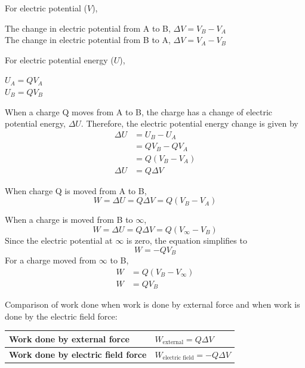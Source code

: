 \documentclass[../../../main.tex]{subfiles}
\begin{document}
\begin{mdframed}
    For electric potential (\(V\)),

    \centering
    The change in electric potential from A to B, \(\Delta V =V_B-V_A\) \\
    The change in electric potential from B to A,  \(\Delta V =V_A-V_B\)
\end{mdframed}

\begin{mdframed}
    For electric potential energy (\(U\)),

    {\centering
            \(U_A=QV_A\) \\
            \(U_B=QV_B\) \\
        }

    \bigskip

    When a charge Q moves from A to B, the charge has a change of electric potential energy, \(\Delta U\). Therefore, the electric potential energy change is given by
    \begin{align*}
        \Delta U & =U_B-U_A    \\
                 & =QV_B-QV_A  \\
                 & =Q(V_B-V_A) \\
        \Delta U & =Q\Delta V
    \end{align*}
\end{mdframed}

\begin{mdframed}
    When charge Q is moved from A to B,
    \begin{equation}
        W=\Delta U =Q\Delta V =Q(V_B-V_A)
    \end{equation}

    When a charge is moved from B to \(\infty\),
    \begin{equation}
        W=\Delta U =Q\Delta V =Q(V_{\infty}-V_B)
    \end{equation}
    Since the electric potential at \(\infty\) is zero, the equation simplifies to
    \begin{equation}
        W=-QV_B
    \end{equation}
    For a charge moved from \(\infty\) to B,
    \begin{align*}
        W & =Q(V_B-V_{\infty}) \\
        W & =QV_B
    \end{align*}
\end{mdframed}

Comparison of work done when work is done by external force and when work is done by the electric field force:

\begin{center}
    \begin{tabularx}{\linewidth}{|X|X|}
        \hline
        \textbf{Work done by external force}       & \(W_{\text{external}}=Q\Delta V\)        \\
        \hline
        \textbf{Work done by electric field force} & \(W_{\text{electric field}}=-Q\Delta V\) \\
        \hline
    \end{tabularx}
\end{center}
\end{document}
